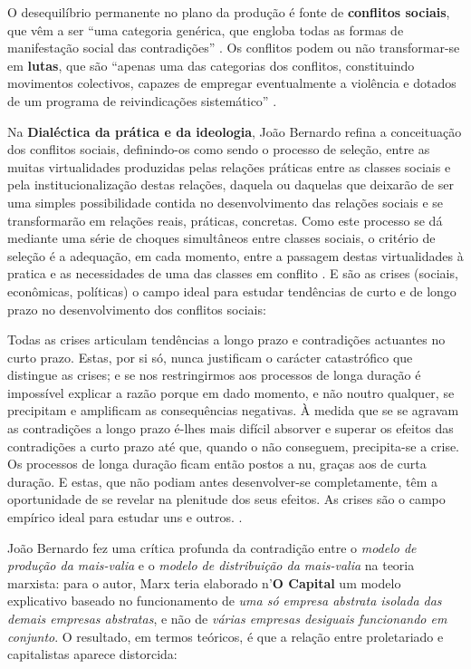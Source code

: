 O desequilíbrio permanente no plano da produção é fonte de \textbf{conflitos sociais}, que vêm a ser ``uma categoria genérica, que engloba todas as formas de manifestação social das contradições'' \cite[p.~10]{BERNARDO1997}. Os conflitos podem ou não transformar-se em \textbf{lutas}, que são ``apenas uma das categorias dos conflitos, constituindo movimentos colectivos, capazes de empregar eventualmente a violência e dotados de um programa de reivindicações sistemático'' \cite[p.~10]{BERNARDO1997}. 

Na \textbf{Dialéctica da prática e da ideologia}, João Bernardo refina a conceituação dos conflitos sociais, definindo-os como sendo o processo de seleção, entre as muitas virtualidades produzidas pelas relações práticas entre as classes sociais e pela institucionalização destas relações, daquela ou daquelas que deixarão de ser uma simples possibilidade contida no desenvolvimento das relações sociais e se transformarão em relações reais, práticas, concretas. Como este processo se dá mediante uma série de choques simultâneos entre classes sociais, o critério de seleção é a adequação, em cada momento, entre a passagem destas virtualidades à pratica e as necessidades de uma das classes em conflito \cite[p.~31-32]{BERNARDO1991a}. E são as crises (sociais, econômicas, políticas) o campo ideal para estudar tendências de curto e de longo prazo no desenvolvimento dos conflitos sociais:

\begin{citacao}
Todas as crises articulam tendências a longo prazo e contradições actuantes no curto prazo. Estas, por si só, nunca justificam o carácter catastrófico que distingue as crises; e se nos restringirmos aos processos de longa duração é impossível explicar a razão porque em dado momento, e não noutro qualquer, se precipitam e amplificam as consequências negativas. À medida que se se agravam as contradições a longo prazo é-lhes mais difícil absorver e superar os efeitos das contradições a curto prazo até que, quando o não conseguem, precipita-se a crise. Os processos de longa duração ficam então postos a nu, graças aos de curta duração. E estas, que não podiam antes desenvolver-se completamente, têm a oportunidade de se revelar na plenitude dos seus efeitos. As crises são o campo empírico ideal para estudar uns e outros. \cite[p.~128]{BERNARDO1997}.
\end{citacao}

João Bernardo fez uma crítica profunda da contradição entre o \textit{modelo de produção da mais-valia} e o \textit{modelo de distribuição da mais-valia} na teoria marxista: para o autor, Marx teria elaborado n'\textbf{O Capital} um modelo explicativo baseado no funcionamento de \textit{uma só empresa abstrata isolada das demais empresas abstratas}, e não de \textit{várias empresas desiguais funcionando em conjunto}. O resultado, em termos teóricos, é que a relação entre proletariado e capitalistas aparece distorcida: 

